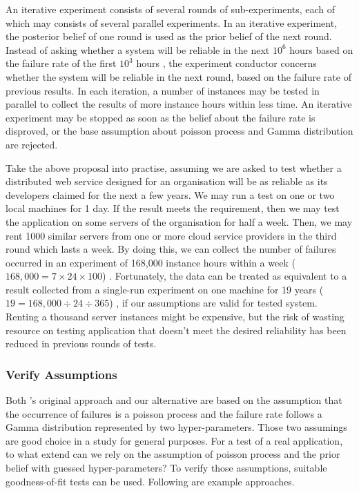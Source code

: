 \documentclass[12pt, authoryear]{article}
\begin{document}
An iterative experiment consists of several rounds of sub-experiments, each of 
which may consists of several parallel experiments.  In an iterative 
experiment, the posterior belief of one round is used as the 
prior belief of the next round.  Instead of asking whether a system will be 
reliable in the next $10^6$ hours based on the failure rate of the first $10^3$ 
hours \citep{Littlewood93}, the experiment conductor concerns whether the 
system will be reliable in 
the next round, based on the failure rate of previous results.  In 
each iteration, a number of instances may be tested in parallel to collect the 
results of more instance hours within less time.  An iterative experiment may 
be stopped as soon as the belief about the failure rate is disproved, or the 
base assumption about poisson process and Gamma distribution are rejected.

Take the above proposal into practise, assuming we are asked to test whether 
a distributed web service designed for an organisation will be as reliable as 
its developers claimed for the next a few years.  We may run a test on one or 
two local machines for 1 day.  If the result meets the requirement, then we may 
test the application on some servers of the organisation for half a week.  
Then, we may rent 1000 similar servers from one or more cloud service providers 
in the third round which lasts a week.  By doing this, we can collect the 
number of failures occurred in an experiment of 168,000 instance hours within 
a week ($168,000 = 7 \times 24 \times 100$) .  Fortunately, the data can be 
treated as equivalent to a result 
collected from a single-run experiment on one machine for 19 years ($19 = 
168,000 \div 24 \div 365$) , if our assumptions are valid for tested system.  
Renting a thousand server instances might be expensive, but the risk of wasting 
resource on testing application that doesn't meet the desired reliability has 
been reduced in previous rounds of tests.


\subsubsection{Verify Assumptions}

Both \citeauthor{Littlewood93}'s original approach and our alternative are based 
on the assumption that the occurrence of failures is a poisson process and the 
failure rate follows a Gamma distribution represented by two 
hyper-parameters.  Those two assumings are good choice in a study for general 
purposes.  For a test of a real application, to what extend can we rely on the 
assumption of poisson process and the prior belief with guessed 
hyper-parameters?  To verify those assumptions, suitable goodness-of-fit tests 
can be used.  Following are example approaches.
\end{document}
